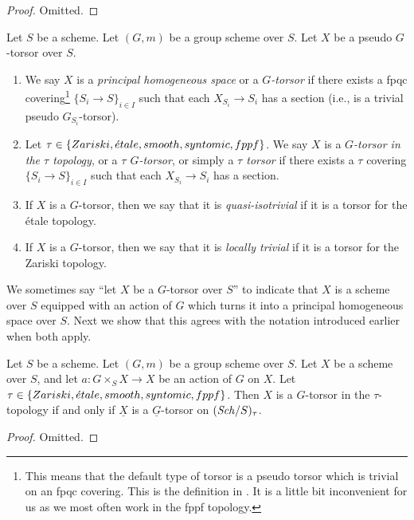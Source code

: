 \begin{proof}
Omitted.
\end{proof}

\begin{definition}
\label{definition-principal-homogeneous-space}
Let $S$ be a scheme.
Let $(G, m)$ be a group scheme over $S$.
Let $X$ be a pseudo $G$-torsor over $S$.
\begin{enumerate}
\item We say $X$ is a {\it principal homogeneous space}
or a {\it $G$-torsor} if there exists a fpqc covering\footnote{This means
that the default type of torsor is a pseudo torsor which is trivial on an
fpqc covering. This is the definition in \cite[Expos\'e IV, 6.5]{SGA3}.
It is a little bit inconvenient for us as we most often work in the fppf
topology.}
$\{S_i \to S\}_{i \in I}$ such that each
$X_{S_i} \to S_i$ has a section (i.e., is a trivial pseudo $G_{S_i}$-torsor).
\item Let $\tau \in \{Zariski, {\acute{e}tale}, smooth, syntomic, fppf\}$.
We say $X$ is a {\it $G$-torsor in the $\tau$ topology}, or a
{\it $\tau$ $G$-torsor}, or simply a {\it $\tau$ torsor}
if there exists a $\tau$ covering $\{S_i \to S\}_{i \in I}$
such that each $X_{S_i} \to S_i$ has a section.
\item If $X$ is a $G$-torsor, then we say that it is
{\it quasi-isotrivial} if it is a torsor for the \'etale topology.
\item If $X$ is a $G$-torsor, then we say that it is
{\it locally trivial} if it is a torsor for the Zariski topology.
\end{enumerate}
\end{definition}

\noindent
We sometimes say ``let $X$ be a $G$-torsor over $S$'' to indicate that
$X$ is a scheme over $S$ equipped with an action of $G$ which turns it
into a principal homogeneous space over $S$.
Next we show that this agrees with the notation introduced earlier
when both apply.

\begin{lemma}
\label{lemma-torsor}
Let $S$ be a scheme.
Let $(G, m)$ be a group scheme over $S$.
Let $X$ be a scheme over $S$, and let
$a : G \times_S X \to X$ be an action of $G$ on $X$.
Let $\tau \in \{Zariski, {\acute{e}tale}, smooth, syntomic, fppf\}$.
Then $X$ is a $G$-torsor in the $\tau$-topology if and only if
$\underline{X}$ is a $\underline{G}$-torsor on $(\mathit{Sch}/S)_\tau$.
\end{lemma}

\begin{proof}
Omitted.
\end{proof}

